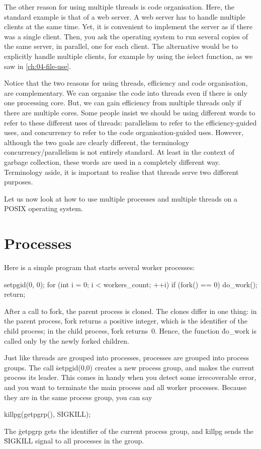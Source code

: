The other reason for using multiple threads is code organisation.
Here, the standard example is that of a web server.
A web server has to handle multiple clients at the same time.
Yet, it is convenient to implement the server as if there was a single client.
Then, you ask the operating system to run several copies of the same server,
  in parallel, one for each client.
The alternative would be to explicitly handle multiple clients,
  for example by using the \.{select} function,
  as we saw in \autoref{ch:04-file-use}.

Notice that the two reasons for using threads, efficiency and code organisation,
  are complementary.
We can organise the code into threads even if there is only one processing core.
But, we can gain efficiency from multiple threads only if there are multiple cores.
Some people insist we should be using different words
  to refer to these different uses of threads:
  parallelism to refer to the efficiency-guided uses,
  and concurrency to refer to the code organisation-guided uses.
However, although the two goals are clearly different,
  the terminology concurrency\slash parallelism is not entirely standard.
At least in the context of garbage collection,
  these words are used in a completely different way.
Terminology aside,
  it is important to realise that threads serve two different purposes.

Let us now look at how to use multiple processes and multiple threads
  on a POSIX operating system.

\section{Processes}

Here is a simple program that starts several worker processes:
\begin{ccode}
setpgid(0, 0);
for (int i = 0; i < workers_count; ++i) if (fork() == 0) { do_work(); return; }
\end{ccode}
After a call to \.{fork}, the parent process is cloned.
The clones differ in one thing:
  in the parent process, \.{fork} returns a positive integer,
    which is the identifier of the child process;
  in the child process, \.{fork} returns~0.
Hence, the function \.{do\_work} is called only by the newly forked children.

Just like threads are grouped into processes,
  processes are grouped into process groups.
The call \.{setpgid(0,0)} creates a new process group,
  and makes the current process its leader.
This comes in handy when you detect some irrecoverable error,
  and you want to terminate the main process and all worker processes.
Because they are in the same process group, you can say
\begin{ccode}
killpg(getpgrp(), SIGKILL);
\end{ccode}
The \.{getpgrp} gets the identifier of the current process group,
  and \.{killpg} sends the \.{SIGKILL} signal to all processes in the group.

